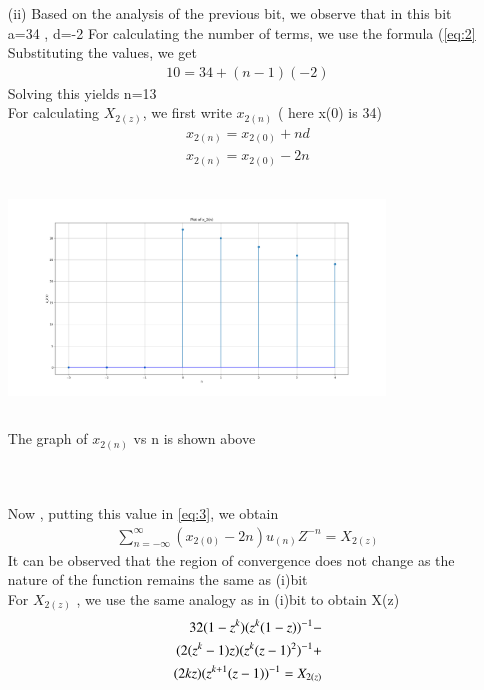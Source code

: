 \documentclass[journal,12pt,twocolumn]{IEEEtran}
\theoremstyle{remark}
\begin{document}
\begin{enumerate}
\item[(ii)]
\vspace{0.5cm}
Based on the analysis of the previous bit, we observe that in this bit \\ a=34 , d=-2
For calculating the number of terms, we use the formula (\eqref{eq:2}\\
Substituting the values, we get
\begin{align}
     10 = 34 + (n-1)(-2)
     \end{align}
Solving this yields n=13\\
For calculating $X_{2(z)}$, we first write $x_{2(n)}$ ( here x(0) is 34)\\
\begin{align}
x_{2(n)} = x_{2(0)} + nd\\
x_{2(n)} = x_{2(0)} -2n
\end{align}
\graphicspath{ {figs/} }
\includegraphics[width=10cm, height=6cm]{graph_2}
\caption{The graph of $x_{2(n)}$ vs n is shown above}\\
\label{graph:3}
\\
Now , putting this value in \eqref{eq:3}, we obtain\\
\begin{align}
\sum_{n=-\infty}^{\infty}(x_{2(0)} -2n)u_{(n)}Z^{-n} =X_{2(z)}
\end{align}
It can be observed that the region of convergence does not change as the nature of the function remains the same as (i)bit\\
For $X_{2(z)}$ , we use the same analogy as in (i)bit to obtain X(z)\\
\begin{align}
   \notag 32(1-z^k)(z^k(1-z))^{-1}-
   \\ \notag(2(z^k-1)z)(z^k(z-1)^2)^{-1}+\\ (2kz)(z^{k+1}(z-1))^{-1}=X_{2(z)}
\end{align}




\end{enumerate}
\end{document}
